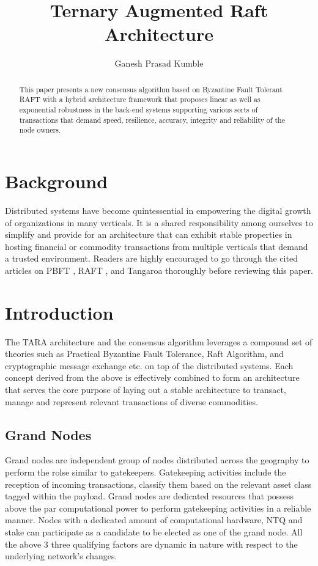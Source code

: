\documentclass[]{article}
\title{Ternary Augmented Raft Architecture}
\author{Ganesh Prasad Kumble}
\begin{document}
\date{}
\maketitle

\begin{abstract}
This paper presents a new consensus algorithm based on Byzantine Fault Tolerant\cite{ARTICLE:1} RAFT \cite{ARTICLE:2} with a hybrid architecture framework that proposes linear as well as exponential robustness in the back-end systems supporting various sorts of transactions that demand speed, resilience, accuracy, integrity and reliability of the node owners.
\end{abstract}

\section{Background}
Distributed systems have become quintessential in empowering the digital growth of organizations in many verticals. It is a shared responsibility among ourselves to simplify and provide for an architecture that can exhibit stable properties in hosting financial or commodity transactions from multiple verticals that demand a trusted environment. Readers are highly encouraged to go through the cited articles on PBFT \cite{ARTICLE:1}, RAFT \cite{ARTICLE:2}, and Tangaroa \cite{ARTICLE:3} thoroughly before reviewing this paper.

\section{Introduction}
The TARA architecture and the consensus algorithm leverages a compound set of theories such as Practical Byzantine Fault Tolerance\cite{ARTICLE:1}, Raft Algorithm\cite{ARTICLE:2}, and cryptographic message exchange etc. on top of the distributed systems\cite{ARTICLE:3}. Each concept derived from the above is effectively combined to form an architecture that serves the core purpose of laying out a stable architecture to transact, manage and represent relevant transactions of diverse commodities.

\subsection{Grand Nodes}
Grand nodes are independent group of nodes distributed across the geography to perform the rolse similar to gatekeepers.
Gatekeeping activities include the reception of incoming transactions, classify them based on the relevant asset class tagged within the payload.
Grand nodes are dedicated resources that possess above the par computational power to perform gatekeeping activities in a reliable manner. Nodes with a dedicated amount of computational hardware, NTQ and stake can participate as a candidate to be elected as one of the grand node. All the above 3 three qualifying factors are dynamic in nature with respect to the underlying network's changes.
\end{document}
